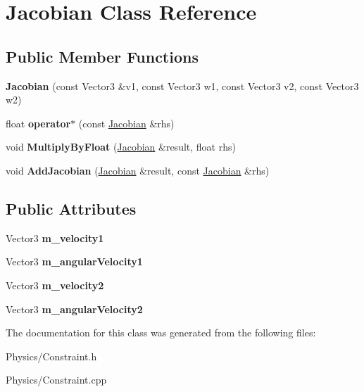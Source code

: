 \hypertarget{classJacobian}{}\section{Jacobian Class Reference}
\label{classJacobian}
\subsection*{Public Member Functions}
\begin{DoxyCompactItemize}
\item 
\mbox{\label{classJacobian_abe4420d2136e50eb25785da05d012c81}} 
{\bfseries Jacobian} (const Vector3 \&v1, const Vector3 w1, const Vector3 v2, const Vector3 w2)
\item 
\mbox{\label{classJacobian_a06719efafa599608998b0262c8cea187}} 
float {\bfseries operator$\ast$} (const \hyperlink{classJacobian}{Jacobian} \&rhs)
\item 
\mbox{\label{classJacobian_ac71a31b06d325fe4ac5baef25bfad5bc}} 
void {\bfseries Multiply\+By\+Float} (\hyperlink{classJacobian}{Jacobian} \&result, float rhs)
\item 
\mbox{\label{classJacobian_a00f89f0575064ee6312bc18a282cf00d}} 
void {\bfseries Add\+Jacobian} (\hyperlink{classJacobian}{Jacobian} \&result, const \hyperlink{classJacobian}{Jacobian} \&rhs)
\end{DoxyCompactItemize}
\subsection*{Public Attributes}
\begin{DoxyCompactItemize}
\item 
\mbox{\label{classJacobian_ae70c2cc3d277a1514e0d505cfbfbb24c}} 
Vector3 {\bfseries m\+\_\+velocity1}
\item 
\mbox{\label{classJacobian_ab7e86a53e4f0ef9c803dbad320ecc088}} 
Vector3 {\bfseries m\+\_\+angular\+Velocity1}
\item 
\mbox{\label{classJacobian_abeedd202dfcee5c1c50c6448f4ae3215}} 
Vector3 {\bfseries m\+\_\+velocity2}
\item 
\mbox{\label{classJacobian_ab822413ac0e6d13a574964472ef04016}} 
Vector3 {\bfseries m\+\_\+angular\+Velocity2}
\end{DoxyCompactItemize}


The documentation for this class was generated from the following files\+:\begin{DoxyCompactItemize}
\item 
Physics/Constraint.\+h\item 
Physics/Constraint.\+cpp\end{DoxyCompactItemize}
